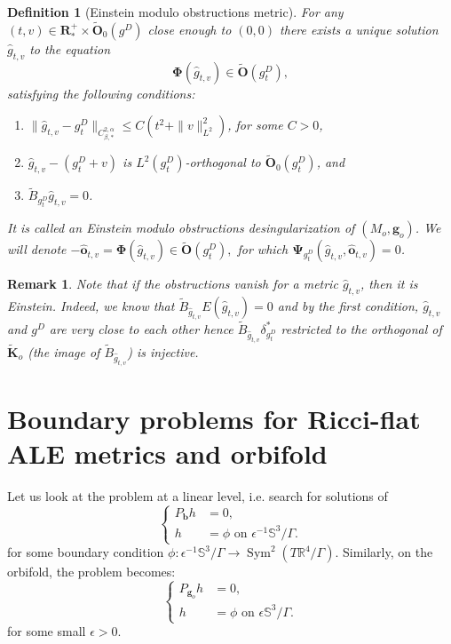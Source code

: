 \documentclass[12pt]{article}
\newtheorem{defn}[thm]{Definition}
\newtheorem{rem}[thm]{Remark}
\begin{document}
    \begin{defn}[Einstein modulo obstructions metric]\label{gluing modulo obstructions}
        For any $(t,v)\in \mathbf{R}^+_*\times \tilde{\mathbf{O}}_0(g^D)$ close enough to $(0,0)$ there exists a \emph{unique} solution $\hat{g}_{t,v}$ to the equation 
        $$\mathbf{\Phi}(\hat{g}_{t,v})\in \tilde{\mathbf{O}}(g^D_t),$$
        satisfying the following conditions: 
        \begin{enumerate}
            \item $\|\hat{g}_{t,v}-g^D_t\|_{C^{2,\alpha}_{\beta,*}}\leqslant C (t^2+\|v\|_{L^2}^2)$, for some $C>0$,
            \item $\hat{g}_{t,v}-(g^D_t+v)$ is $L^2(g^D_t)$-orthogonal to $\tilde{\mathbf{O}}_0(g^D_t)$, and
            \item $\tilde{B}_{g^D_t}\hat{g}_{t,v} = 0$.
        \end{enumerate}
        It is called an \emph{Einstein modulo obstructions} desingularization of $(M_o,\mathbf{g}_o)$. We will denote  $-\hat{\mathbf{o}}_{t,v}=\mathbf{\Phi}(\hat{g}_{t,v})\in \tilde{\mathbf{O}}(g^D_t),$ for which $ \mathbf{\Psi}_{g^D_t}(\hat{g}_{t,v},\hat{\mathbf{o}}_{t,v})=0  $.
    \end{defn}
    \begin{rem}
        Note that if the obstructions vanish for a metric $\hat{g}_{t,v}$, then it is Einstein. Indeed, we know that $\tilde{B}_{\hat{g}_{t,v}}E(\hat{g}_{t,v})=0$ and by the first condition, $\hat{g}_{t,v}$ and $g^D$ are very close to each other hence $\tilde{B}_{\hat{g}_{t,v}}\delta^*_{g^D_t}$ restricted to the orthogonal of $\tilde{\mathbf{K}}_o$ (the image of $\tilde{B}_{\hat{g}_{t,v}}$) is injective.
    \end{rem}
   
   \section{Boundary problems for Ricci-flat ALE metrics and orbifold}
   
   Let us look at the problem at a linear level, i.e. search for solutions of 
   \begin{equation}
       \left\{\begin{aligned}
            P_\mathbf{b} h &=0,\\
            h &= \phi \text{ on } \epsilon^{-1}\mathbb{S}^3\slash\Gamma.
       \end{aligned}\right.\label{boundary ALE}
   \end{equation}
   for some boundary condition $\phi: \epsilon^{-1}\mathbb{S}^3\slash\Gamma \to \operatorname{Sym}^2(T\mathbb{R}^4\slash\Gamma)$. Similarly, on the orbifold, the problem becomes:
   \begin{equation}
       \left\{\begin{aligned}
            P_{\mathbf{g}_o} h &=0,\\
            h &= \phi \text{ on } \epsilon\mathbb{S}^3\slash\Gamma.
       \end{aligned}\right.\label{boundary orb}
   \end{equation}
   for some small $\epsilon>0$. 
   
\end{document}
